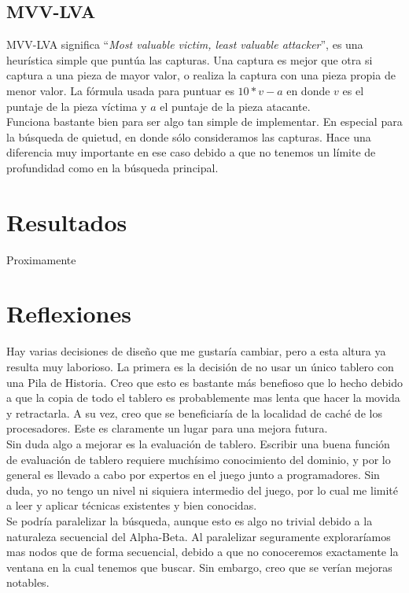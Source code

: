 \documentclass{article}
\begin{document}
\subsection{MVV-LVA}
MVV-LVA significa ``\emph{Most valuable victim, least valuable
attacker}'', es una heurística simple que puntúa las capturas. Una
captura es mejor que otra si captura a una pieza de mayor valor, o
realiza la captura con una pieza propia de menor valor. La fórmula
usada para puntuar es $10*v - a$ en donde $v$ es el puntaje de la pieza
víctima y $a$ el puntaje de la pieza atacante.
\\

Funciona bastante bien para ser algo tan simple de implementar. En
especial para la búsqueda de quietud, en donde sólo consideramos las
capturas. Hace una diferencia muy importante en ese caso debido a que no
tenemos un límite de profundidad como en la búsqueda principal.
\\

\section{Resultados}
Proximamente

\section{Reflexiones}
Hay varias decisiones de diseño que me gustaría cambiar, pero a esta
altura ya resulta muy laborioso. La primera es la decisión de no usar
un único tablero con una Pila de Historia. Creo que esto es bastante
más benefioso que lo hecho debido a que la copia de todo el tablero es
probablemente mas lenta que hacer la movida y retractarla. A su vez,
creo que se beneficiaría de la localidad de caché de los procesadores.
Este es claramente un lugar para una mejora futura.
\\

Sin duda algo a mejorar es la evaluación de tablero. Escribir una buena
función de evaluación de tablero requiere muchísimo conocimiento
del dominio, y por lo general es llevado a cabo por expertos en el
juego junto a programadores. Sin duda, yo no tengo un nivel ni siquiera
intermedio del juego, por lo cual me limité a leer y aplicar técnicas
existentes y bien conocidas.
\\

Se podría paralelizar la búsqueda, aunque esto es algo no trivial
debido a la naturaleza secuencial del Alpha-Beta. Al paralelizar
seguramente exploraríamos mas nodos que de forma secuencial, debido a
que no conoceremos exactamente la ventana en la cual tenemos que buscar.
Sin embargo, creo que se verían mejoras notables.
\\
\end{document}

